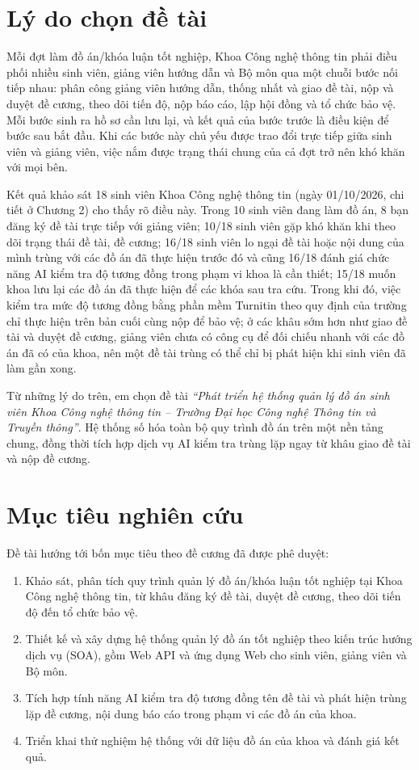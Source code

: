 \documentclass[../main.tex]{subfiles}
\begin{document}
\section*{Lý do chọn đề tài}

Mỗi đợt làm đồ án/khóa luận tốt nghiệp, Khoa Công nghệ thông tin phải điều phối nhiều sinh viên, giảng viên hướng dẫn và Bộ môn qua một chuỗi bước nối tiếp nhau: phân công giảng viên hướng dẫn, thống nhất và giao đề tài, nộp và duyệt đề cương, theo dõi tiến độ, nộp báo cáo, lập hội đồng và tổ chức bảo vệ. Mỗi bước sinh ra hồ sơ cần lưu lại, và kết quả của bước trước là điều kiện để bước sau bắt đầu. Khi các bước này chủ yếu được trao đổi trực tiếp giữa sinh viên và giảng viên, việc nắm được trạng thái chung của cả đợt trở nên khó khăn với mọi bên.

Kết quả khảo sát 18 sinh viên Khoa Công nghệ thông tin (ngày 01/10/2026, chi tiết ở Chương 2) cho thấy rõ điều này. Trong 10 sinh viên đang làm đồ án, 8 bạn đăng ký đề tài trực tiếp với giảng viên; 10/18 sinh viên gặp khó khăn khi theo dõi trạng thái đề tài, đề cương; 16/18 sinh viên lo ngại đề tài hoặc nội dung của mình trùng với các đồ án đã thực hiện trước đó và cũng 16/18 đánh giá chức năng AI kiểm tra độ tương đồng trong phạm vi khoa là cần thiết; 15/18 muốn khoa lưu lại các đồ án đã thực hiện để các khóa sau tra cứu. Trong khi đó, việc kiểm tra mức độ tương đồng bằng phần mềm Turnitin theo quy định của trường chỉ thực hiện trên bản cuối cùng nộp để bảo vệ; ở các khâu sớm hơn như giao đề tài và duyệt đề cương, giảng viên chưa có công cụ để đối chiếu nhanh với các đồ án đã có của khoa, nên một đề tài trùng có thể chỉ bị phát hiện khi sinh viên đã làm gần xong.

Từ những lý do trên, em chọn đề tài \textit{``Phát triển hệ thống quản lý đồ án sinh viên Khoa Công nghệ thông tin -- Trường Đại học Công nghệ Thông tin và Truyền thông''}. Hệ thống số hóa toàn bộ quy trình đồ án trên một nền tảng chung, đồng thời tích hợp dịch vụ AI kiểm tra trùng lặp ngay từ khâu giao đề tài và nộp đề cương.

\section*{Mục tiêu nghiên cứu}

Đề tài hướng tới bốn mục tiêu theo đề cương đã được phê duyệt:
\begin{enumerate}
    \item Khảo sát, phân tích quy trình quản lý đồ án/khóa luận tốt nghiệp tại Khoa Công nghệ thông tin, từ khâu đăng ký đề tài, duyệt đề cương, theo dõi tiến độ đến tổ chức bảo vệ.
    \item Thiết kế và xây dựng hệ thống quản lý đồ án tốt nghiệp theo kiến trúc hướng dịch vụ (SOA), gồm Web API và ứng dụng Web cho sinh viên, giảng viên và Bộ môn.
    \item Tích hợp tính năng AI kiểm tra độ tương đồng tên đề tài và phát hiện trùng lặp đề cương, nội dung báo cáo trong phạm vi các đồ án của khoa.
    \item Triển khai thử nghiệm hệ thống với dữ liệu đồ án của khoa và đánh giá kết quả.
\end{enumerate}
\end{document}
